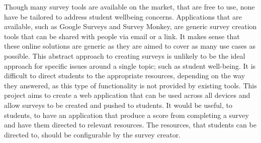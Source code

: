 Though many survey tools are available on the market, that are free to use, none have be tailored to address student wellbeing concerns.
Applications that are available, such as Google Surveys and Survey Monkey, are generic survey creation tools that can be shared with 
people via email or a link.
It makes sense that these online solutions are generic as they are aimed to cover as many use cases as possible.
This abstract approach to creating surveys is unlikely to be the ideal approach for specific issues around a single topic; such as
student well-being.
It is difficult to direct students to the appropriate resources, depending on the way they answered, as this type of functionality is not
provided by existing tools.
This project aims to create a web application that can be used across all devices and allow surveys to be created and pushed to students.
It would be useful, to students, to have an application that produce a score from completing a survey and have them directed to relevant
resources. The resources, that students can be directed to, should be configurable by the survey creator.




    





